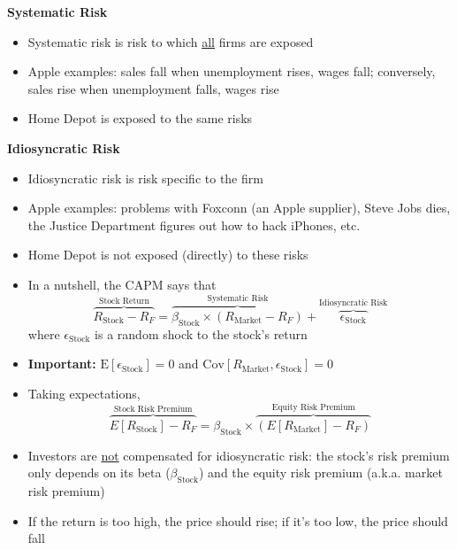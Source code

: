 \documentclass{beamer}
\begin{document}
\begin{frame}{}
	\noindent\textbf{Systematic Risk}
	\begin{itemize}
		\item Systematic risk is risk to which \underline{all} firms are exposed
		\item Apple examples: sales fall when unemployment rises, wages fall; conversely, sales rise when unemployment falls, wages rise
		\item Home Depot is exposed to the same risks
	\end{itemize}
	\noindent\textbf{Idiosyncratic Risk}
	\begin{itemize}
		\item Idiosyncratic risk is risk specific to the firm
		\item Apple examples: problems with Foxconn (an Apple supplier), Steve Jobs dies, the Justice Department figures out how to hack iPhones, etc.
		\item Home Depot is not exposed (directly) to these risks
	\end{itemize}
\end{frame}


\begin{frame}{}
\begin{itemize}
\item In a nutshell, the CAPM says that
\begin{equation*}
\overbrace{R_{\text{Stock}}-R_{F}}^{\text{Stock Return}}=\overbrace{\beta_{\text{Stock}}\times(R_{\text{Market}}-R_{F})}^{\text{Systematic Risk}}+\overbrace{\epsilon_{\text{Stock}}}^{\text{Idiosyncratic Risk}}
\end{equation*}
where $\epsilon_{\text{Stock}}$ is a random shock to the stock's return 
\item \textbf{Important:} $\text{E}[\epsilon_{\text{Stock}}]=0$ and $\text{Cov}[R_{\text{Market}},\epsilon_{\text{Stock}}]=0$
\item Taking expectations, 
\begin{equation*}
\overbrace{E[R_{\text{Stock}}]-R_{F}}^{\text{Stock Risk Premium}}=\beta_{\text{Stock}}\times\overbrace{(E[R_{\text{Market}}]-R_{F})}^{\text{Equity Risk Premium}}
\end{equation*}
\item Investors are \underline{not} compensated for idiosyncratic risk: the stock's risk premium only depends on its beta ($\beta_{\text{Stock}}$) and the equity risk premium (a.k.a. market risk premium)
\end{itemize}
\end{frame}
\begin{frame}{}
	\begin{itemize}
		\item If the return is too high, the price should rise; if it's too low, the price should fall
	\end{itemize}
\end{frame}
\end{document}
